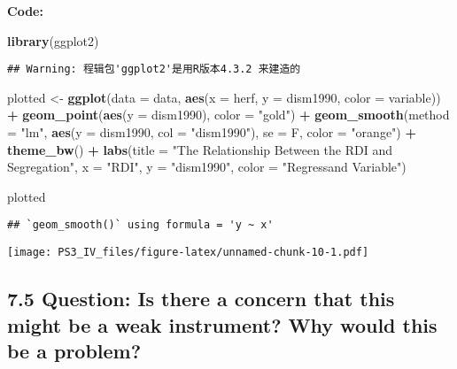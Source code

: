 \documentclass[
]{article}
\newenvironment{Shaded}{\begin{snugshade}}{\end{snugshade}}
\newcommand{\AttributeTok}[1]{\textcolor[rgb]{0.13,0.29,0.53}{#1}}
\newcommand{\FunctionTok}[1]{\textcolor[rgb]{0.13,0.29,0.53}{\textbf{#1}}}
\newcommand{\NormalTok}[1]{#1}
\newcommand{\OtherTok}[1]{\textcolor[rgb]{0.56,0.35,0.01}{#1}}
\newcommand{\SpecialCharTok}[1]{\textcolor[rgb]{0.81,0.36,0.00}{\textbf{#1}}}
\newcommand{\StringTok}[1]{\textcolor[rgb]{0.31,0.60,0.02}{#1}}
\begin{document}
\textbf{Code:}

\begin{Shaded}
\begin{Highlighting}[]
\FunctionTok{library}\NormalTok{(ggplot2)}
\end{Highlighting}
\end{Shaded}

\begin{verbatim}
## Warning: 程辑包'ggplot2'是用R版本4.3.2 来建造的
\end{verbatim}

\begin{Shaded}
\begin{Highlighting}[]
\NormalTok{plotted }\OtherTok{\textless{}{-}} \FunctionTok{ggplot}\NormalTok{(}\AttributeTok{data =}\NormalTok{ data, }\FunctionTok{aes}\NormalTok{(}\AttributeTok{x =}\NormalTok{ herf, }\AttributeTok{y =}\NormalTok{ dism1990, }\AttributeTok{color =}\NormalTok{ variable)) }\SpecialCharTok{+}
  \FunctionTok{geom\_point}\NormalTok{(}\FunctionTok{aes}\NormalTok{(}\AttributeTok{y =}\NormalTok{ dism1990), }\AttributeTok{color =} \StringTok{"gold"}\NormalTok{) }\SpecialCharTok{+}
  \FunctionTok{geom\_smooth}\NormalTok{(}\AttributeTok{method =} \StringTok{"lm"}\NormalTok{, }\FunctionTok{aes}\NormalTok{(}\AttributeTok{y =}\NormalTok{ dism1990, }\AttributeTok{col =} \StringTok{"dism1990"}\NormalTok{), }\AttributeTok{se =}\NormalTok{ F, }\AttributeTok{color =} \StringTok{"orange"}\NormalTok{) }\SpecialCharTok{+}
  \FunctionTok{theme\_bw}\NormalTok{() }\SpecialCharTok{+}
  \FunctionTok{labs}\NormalTok{(}\AttributeTok{title =} \StringTok{"The Relationship Between the RDI and Segregation"}\NormalTok{, }\AttributeTok{x =} \StringTok{"RDI"}\NormalTok{, }\AttributeTok{y =} \StringTok{"dism1990"}\NormalTok{, }\AttributeTok{color =} \StringTok{"Regressand Variable"}\NormalTok{)}
 
\NormalTok{plotted}
\end{Highlighting}
\end{Shaded}

\begin{verbatim}
## `geom_smooth()` using formula = 'y ~ x'
\end{verbatim}

\texttt{[image: PS3\_IV\_files/figure-latex/unnamed-chunk-10-1.pdf]}

\clearpage

\hypertarget{question-is-there-a-concern-that-this-might-be-a-weak-instrument-why-would-this-be-a-problem}{%
\subsection{7.5 Question: Is there a concern that this might be a weak
instrument? Why would this be a
problem?}\label{question-is-there-a-concern-that-this-might-be-a-weak-instrument-why-would-this-be-a-problem}}
\end{document}
